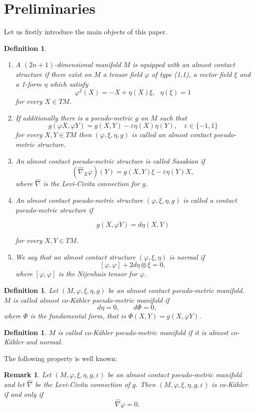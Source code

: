 \documentclass[12pt,a4paper,final]{amsart}
\numberwithin{equation}{section}
\newtheorem{uw}[tw]{Remark}
\theoremstyle{df}
\newtheorem{df}[tw]{Definition}
\newcommand{\eps}{\varepsilon}
\begin{document}
\section{Preliminaries}\label{sec::Preliminaries}
Let us firstly introduce the main objects of this paper.
\begin{df} \begin{enumerate}
    \item 

A $(2n+1)$-dimensional manifold $M$ is equipped with an
\emph{almost contact structure} if there exist on $M$ a tensor
field $\varphi$ of type (1,1), a vector field $\xi$ and a 1-form
$\eta$ which satisfy
$$
\varphi^2(X)=-X+\eta(X)\xi, \ \ \ 
\eta(\xi)=1
$$
for every $X\in TM$.

\item If additionally there is a pseudo-metric
$g$ on $M$ such that
$$
g(\varphi X,\varphi Y)=g(X,Y)-\eps\eta(X)\eta(Y),\quad \eps \in \{-1,1\}
$$
for every $X,Y\in TM$ then $(\varphi,\xi,\eta,g)$ is called an
\emph{almost contact pseudo-metric structure}. 
\item An almost contact pseudo-metric
structure is called  \emph{Sasakian} if
$$
(\widehat{\nabla}_X\varphi)(Y)=g(X,Y)\xi-\eps\eta(Y)X,
$$
where $\widehat{\nabla}$ is the Levi-Civita connection for $g$. 
\item An
almost contact pseudo-metric structure $(\varphi,\xi,\eta,g)$ is called a
\emph{contact pseudo-metric structure} if

$$g(X,\varphi Y)=d\eta(X,Y)$$

for every $X,Y\in TM$.
\item
We say that an almost contact structure $(\varphi,\xi,\eta)$ is
\emph{normal} if
$$
[\varphi,\varphi]+2d\eta\otimes\xi=0,
$$
where $[\varphi,\varphi]$ is the Nijenhuis tensor for $\varphi$.
\end{enumerate}
\end{df}
\begin{df}
Let $(M,\varphi,\xi,\eta,g)$ be an almost contact pseudo-metric manifold. $M$ is called almost co-K\"ahler pseudo-metric manifold if
$$
d\eta=0,\qquad d \Phi=0,
$$
where $\Phi$ is the fundamental form, that is $\Phi (X,Y)=g(X,\varphi Y)$.
\end{df}

\begin{df}
$M$ is called  co-K\"ahler pseudo-metric manifold if it is almost co-K\"ahler and normal.
\end{df}

The following property is well known:
\begin{uw}\label{uw::cok::char}
Let $(M,\varphi,\xi,\eta,g,\eps)$ be an almost contact pseudo-metric manifold
and let $\widehat{\nabla}$ be the Levi-Civita connection of $g$. Then
$(M,\varphi,\xi,\eta,g,\eps)$ is co-K\"ahler if and only if
$$
\widehat{\nabla}\varphi=0.
$$
\end{uw}
\end{document}
